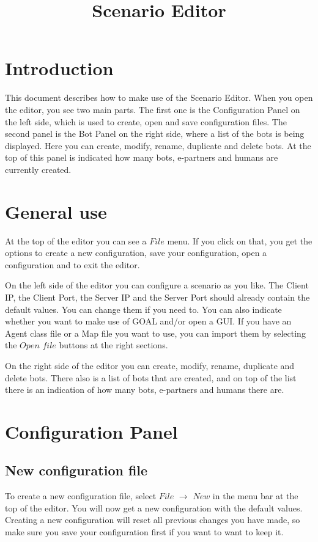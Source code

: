 \documentclass[a4paper]{article}
\title{Scenario Editor}
\date{}
\begin{document}
\maketitle
\newpage

\tableofcontents
\newpage

\section{Introduction}
This document describes how to make use of the Scenario Editor. When you open the editor, you see two main parts. The first one is the Configuration Panel on the left side, which is used to create, open and save configuration files. The second panel is the Bot Panel on the right side, where a list of the bots is being displayed. Here you can create, modify, rename, duplicate and delete bots. At the top of this panel is indicated how many bots, e-partners and humans are currently created.

\section{General use}
At the top of the editor you can see a $File$ menu. If you click on that, you get the options to create a new configuration, save your configuration, open a configuration and to exit the editor.

On the left side of the editor you can configure a scenario as you like. The Client IP, the Client Port, the Server IP and the Server Port should already contain the default values. You can change them if you need to. You can also indicate whether you want to make use of GOAL and/or open a GUI. If you have an Agent class file or a Map file you want to use, you can import them by selecting the $Open$ $file$ buttons at the right sections.

On the right side of the editor you can create, modify, rename, duplicate and delete bots. There also is a list of bots that are created, and on top of the list there is an indication of how many bots, e-partners and humans there are.

\section{Configuration Panel}
\subsection{New configuration file}
To create a new configuration file, select $File$ $\to$ $New$ in the menu bar at the top of the editor. You will now get a new configuration with the default values. Creating a new configuration will reset all previous changes you have made, so make sure you save your configuration first if you want to want to keep it.
\end{document}
